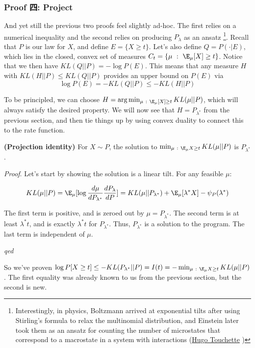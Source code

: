 \documentclass[
  letterpaper,
  DIV=11,
  numbers=noendperiod]{scrartcl}
\begin{document}
\subsubsection{Proof 四: Project}\label{proof-ux56db-project}

And yet still the previous two proofs feel slightly ad-hoc. The first
relies on a numerical inequality and the second relies on producing
\(P_\lambda\) as an ansatz \footnote{Interestingly, in physics,
  Boltzmann arrived at exponential tilts after using Stirling's formula
  to relax the multinomial distribution, and Einstein later took them as
  an ansatz for counting the number of microstates that correspond to a
  macrostate in a system with interactions
  (\href{https://www.youtube.com/watch?v=Wxslcy56KFM}{Hugo Touchette} )}.
Recall that \(P\) is our law for \(X\), and define \(E = \{X \geq t\}\).
Let's also define \(Q = P(\cdot | E)\), which lies in the closed, convex
set of measures \(C_t = \{\mu \ : \ \E_\mu[X] \geq t\}\). Notice that we
then have \(KL(Q || P) = -\log P(E)\). This means that any measure \(H\)
with \(KL(H || P) \leq KL(Q || P)\) provides an upper bound on \(P(E)\)
via \[\log P(E) = -KL(Q || P) \leq -  KL(H || P)\]

To be principled, we can choose
\(H = \arg\min_{\mu \ : \ \E_\mu[X] \geq t} KL(\mu || P)\), which will
always satisfy the desired property. We will now see that
\(H = P_{\lambda^*}\) from the previous section, and then tie things up
by using convex duality to connect this to the rate function.

\textbf{(Projection identity)} For \(X \sim P\), the solution to
\(\min_{\mu \ : \ \E_{\mu}X \geq t} KL(\mu || P)\) is \(P_{\lambda^*}\).

\emph{Proof}. Let's start by showing the solution is a linear tilt. For
any feasible \(\mu\):

\[KL(\mu || P) = \E_\mu [\log \frac{d\mu}{dP_{\lambda^*}}\frac{dP_\lambda}{dP}] = KL(\mu || P_{\lambda^*}) + \E_{\mu}[\lambda^* X] - \psi_P(\lambda^*)\]

The first term is positive, and is zeroed out by
\(\mu = P_{\lambda^*}\). The second term is at least \(\lambda^* t\),
and is exactly \(\lambda^* t\) for \(P_{\lambda^*}\). Thus,
\(P_{\lambda^*}\) is a solution to the program. The last term is
independent of \(\mu\).

\emph{qed}

So we've proven
\(\log P[X \geq t] \leq -KL(P_{\lambda^*} || P) = I(t) = -\min_{\mu \ : \ \E_\mu X \geq t} KL(\mu || P)\).
The first equality was already known to us from the previous section,
but the second is new.
\end{document}
